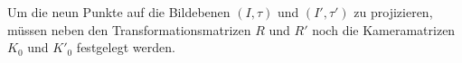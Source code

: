 

%


Um die neun Punkte auf die Bildebenen $(I,\tau)$ und $(I',\tau')$ zu projizieren, müssen neben den Transformationsmatrizen $R$ und $R'$ noch die Kameramatrizen $K_0$ und $K'_0$ festgelegt werden.


